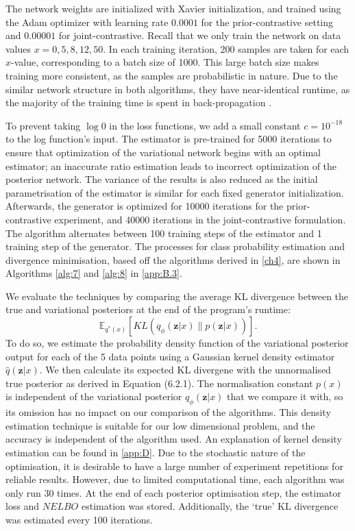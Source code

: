 \documentclass[honours,12pt]{unswthesis}
\newcommand{\E}{\mathbb{E}}
\numberwithin{equation}{section}
\theoremstyle{definition}
\begin{document}
The network weights are initialized with Xavier initialization, and trained using the Adam optimizer with learning rate $0.0001$ for the prior-contrastive setting and $0.00001$ for joint-contrastive. Recall that we only train the network on data values $x=0,5,8,12,50$. In each training iteration, 200 samples are taken for each $x$-value, corresponding to a batch size of 1000. This large batch size makes training more consistent, as the samples are probabilistic in nature. Due to the similar network structure in both algorithms, they have near-identical runtime, as the majority of the training time is spent in back-propagation \citep{DeepLearning}.

To prevent taking $\log 0$ in the loss functions, we add a small constant $c=10^{-18}$ to the log function's input. The estimator is pre-trained for 5000 iterations to ensure that optimization of the variational network begins with an optimal estimator; an inaccurate ratio estimation leads to incorrect optimization of the posterior network. The variance of the results is also reduced as the initial parametrisation of the estimator is similar for each fixed generator initialization. Afterwards, the generator is optimized for 10000 iterations for the prior-contrastive experiment, and 40000 iterations in the joint-contrastive formulation. The algorithm alternates between 100 training steps of the estimator and 1 training step of the generator. The processes for class probability estimation and divergence minimisation, based off the algorithms derived in \autoref{ch4}, are shown in Algorithms \ref{alg:7} and \ref{alg:8} in \autoref{app:B.3}.

We evaluate the techniques by comparing the average KL divergence between the true and variational posteriors at the end of the program's runtime: \[\E_{q^*(x)}\left[KL(q_\phi(\bm{z}|x)\|p(\bm{z}|x))\right].\] To do so, we estimate the probability density function of the variational posterior output for each of the 5 data points using a Gaussian kernel density estimator $\hat{q}(\bm{z}|x)$. We then calculate its expected KL divergene with the unnormalised true posterior as derived in Equation (6.2.1). The normalisation constant $p(x)$ is independent of the variational posterior $q_\phi(\bm{z}|x)$ that we compare it with, so its omission has no impact on our comparison of the algorithms. This density estimation technique is suitable for our low dimensional problem, and the accuracy is independent of the algorithm used. An explanation of kernel density estimation can be found in \autoref{app:D}. Due to the stochastic nature of the optimisation, it is desirable to have a large number of experiment repetitions for reliable results. However, due to limited computational time, each algorithm was only run 30 times. At the end of each posterior optimisation step, the estimator loss and $NELBO$ estimation was stored. Additionally, the `true' KL divergence was estimated every 100 iterations.
\end{document}
